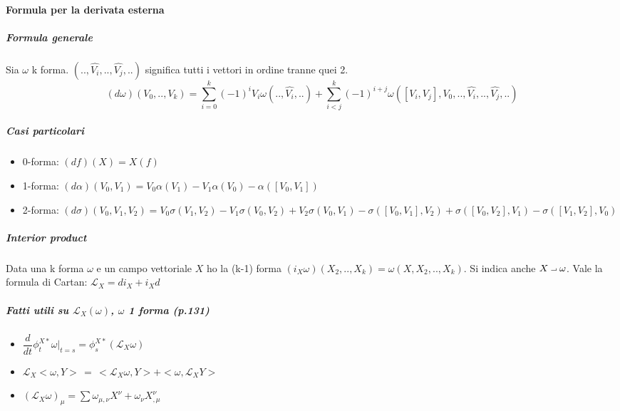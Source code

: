 \documentclass[]{article}
\newcommand{\intprod}{\mathbin{\raisebox{\depth}{\scalebox{1}[-1]{$\lnot$}}}}%
\begin{document}
\paragraph{Formula per la derivata esterna}
\subparagraph{Formula generale}
Sia $\omega$ k forma. $(..,\hat{V_i},.., \hat{V_j},..)$ significa tutti i vettori in ordine tranne quei 2.
$$(d\omega)(V_0, .., V_k) = \sum_{i=0}^{k} (-1)^i V_i \omega(..,\hat{V_i},..) + \sum_{i<j}^{k} (-1)^{i+j} \omega([V_i, V_j],V_0,..,\hat{V_i},..,\hat{V_j},..)$$
\subparagraph{Casi particolari}
\begin{itemize}
	\item 0-forma: $(df)(X) = X(f)$
	\item 1-forma: $(d\alpha)(V_0,V_1) = V_0\alpha(V_1) - V_1\alpha(V_0) - \alpha([V_0, V_1])$
	\item 2-forma: $(d\sigma)(V_0, V_1, V_2) = V_0\sigma(V_1,V_2) - V_1\sigma(V_0,V_2) + V_2\sigma(V_0,V_1) - \sigma([V_0,V_1],V_2) + \sigma([V_0,V_2],V_1) - \sigma([V_1,V_2],V_0)$
\end{itemize}

\subparagraph{Interior product}
Data una k forma $\omega$ e un campo vettoriale $X$ ho la (k-1) forma $(i_X \omega)(X_2, .., X_k) = \omega(X, X_2, .. , X_k)$. Si indica anche $X \intprod \omega$. Vale la formula di Cartan: $\mathcal{L}_X = d i_X + i_X d$

\subparagraph{Fatti utili su $\mathcal{L}_X(\omega)$, $\omega$ 1 forma (p.131)}
\begin{itemize}
	\item $\dfrac{d}{dt} \phi_t^{X*} \omega |_{t=s} = \phi_s^{X*} (\mathcal{L}_X\omega)$
	\item $\mathcal{L}_X<\omega, Y>\, =\, <\mathcal{L}_X \omega, Y> + <\omega, \mathcal{L}_X Y>$
	\item $(\mathcal{L}_X \omega)_\mu = \sum \omega_{\mu,\nu} X^\nu + \omega_\nu X^\nu_{,\mu}$
\end{itemize}
\end{document}
